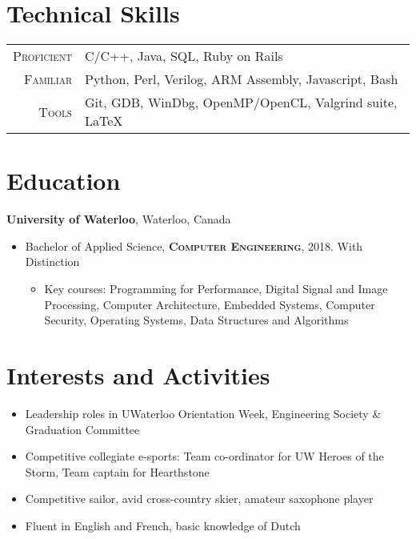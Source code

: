 \documentclass[a4paper,10pt]{article}
\begin{document}
\begin{minipage}[t]{0.36\textwidth}

\section{Technical Skills}
\medskip

\renewcommand{\arraystretch}{1.8}
\begin{tabularx}{\linewidth}{r | X}

\textsc{Proficient} & C/C++, Java, SQL, Ruby on Rails \\
\textsc{Familiar} & Python, Perl, Verilog, ARM Assembly, Javascript, Bash \\
\textsc{Tools} & Git, GDB, WinDbg, OpenMP/OpenCL, Valgrind suite, \LaTeX \\

\end{tabularx}
\renewcommand{\arraystretch}{1}
\medskip

\section{Education}
\textbf{University of Waterloo}, Waterloo, Canada
\medskip
\begin{itemize}
    \item{Bachelor of Applied Science, \textsc{\textbf{Computer Engineering}}, 2018. With Distinction}
    \begin{itemize}
        \item {\footnotesize{Key courses: Programming for Performance, Digital Signal and Image Processing, Computer Architecture, Embedded Systems, Computer Security, Operating Systems, Data Structures and Algorithms}}
    \end{itemize}
\end{itemize}

\medskip

\section{Interests and Activities}
\medskip
\begin{itemize}
	\item {Leadership roles in UWaterloo Orientation Week, Engineering Society \& Graduation Committee}
	\item {Competitive collegiate e-sports: Team co-ordinator for UW Heroes of the Storm, Team captain for Hearthstone}
	\item {Competitive sailor, avid cross-country skier, amateur saxophone player}
    \item {Fluent in English and French, basic knowledge of Dutch}
\end{itemize}


\end{minipage}
\end{document}
